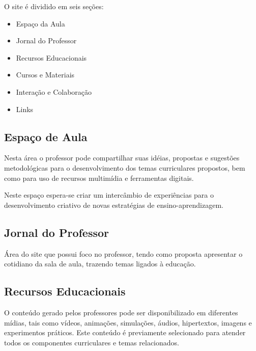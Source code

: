 \documentclass[a4paper,12pt]{report}
\begin{document}
        O site é dividido em seis seções:

        \begin{itemize}

            \item Espaço da Aula

            \item Jornal do Professor

            \item Recursos Educacionais

            \item Cursos e Materiais

            \item Interação e Colaboração

            \item Links

        \end{itemize}

            \subsection{Espaço de Aula}
            Nesta área o professor pode compartilhar suas idéias, propostas e
            sugestões metodológicas para o desenvolvimento dos temas
            curriculares propostos, bem como para uso de recursos multimídia e
            ferramentas digitais.

            Neste espaço espera-se criar um intercâmbio de experiências para o
            desenvolvimento criativo de novas estratégias de ensino-aprendizagem.

            \subsection{Jornal do Professor}
            Área do site que possui foco no professor, tendo como proposta
            apresentar o cotidiano da sala de aula, trazendo temas ligados à
            educação.

            \subsection{Recursos Educacionais}
            O conteúdo gerado pelos professores pode ser disponibilizado em
            diferentes mídias, tais como vídeos, animações, simulações, áudios,
            hipertextos, imagens e experimentos práticos. Este conteúdo é
            previamente selecionado para atender todos os componentes
            curriculares e temas relacionados.
\end{document}
